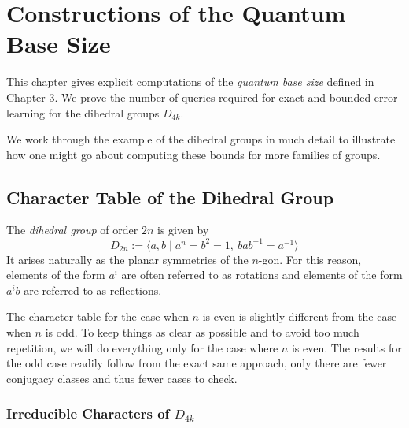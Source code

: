 
\chapter{Constructions of the Quantum Base Size}

This chapter gives explicit computations of the \emph{quantum base size} defined in Chapter 3. We prove the number 
of queries required for exact and bounded error learning for the dihedral groups $D_{4k}$.

We work through the example of the dihedral groups in much detail to illustrate how one might go about computing 
these bounds for more families of groups.

\section{Character Table of the Dihedral Group}

The \emph{dihedral group} of order $2n$ is given by
\[
    D_{2n} := \langle a,b \mid a^n = b^2 = 1,\ bab^{-1} = a^{-1} \rangle
\]
It arises naturally as the planar symmetries of the $n$-gon. For this reason, elements of the form $a^i$ are often 
referred to as rotations and elements of the form $a^ib$ are referred to as reflections.

The character table for the case when $n$ is even is slightly different from the case when $n$ is odd. To keep 
things as clear as possible and to avoid too much repetition, we will do everything only for the case where $n$ is 
even. The results for the odd case readily follow from the exact same approach, only there are fewer conjugacy 
classes and thus fewer cases to check.








\subsection{Irreducible Characters of $D_{4k}$}

